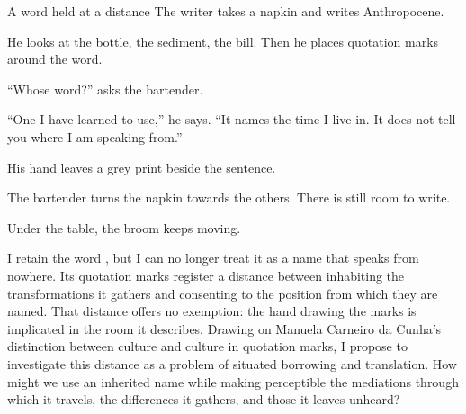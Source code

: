 \begin{ato}{A word held at a distance}
The writer takes a napkin and writes Anthropocene.

He looks at the bottle, the sediment, the bill. Then he places quotation
marks around the word.

“Whose word?” asks the bartender.

“One I have learned to use,” he says. “It names the time I live in.
It does not tell you where I am speaking from.”

His hand leaves a grey print beside the sentence.

The bartender turns the napkin towards the others. There is still room
to write.

Under the table, the broom keeps moving.
\end{ato}

I retain the word \anthropocene, but I can no longer treat it as a name
that speaks from nowhere. Its quotation marks register a distance
between inhabiting the transformations it gathers and consenting to
the position from which they are named. That distance offers no
exemption: the hand drawing the marks is implicated in the room it
describes. Drawing on Manuela Carneiro da Cunha's distinction between
culture and culture in quotation marks, I propose to investigate this
distance as a problem of situated borrowing and translation.
How might we use an inherited name while making perceptible the
mediations through which it travels, the differences it gathers, and
those it leaves unheard?

